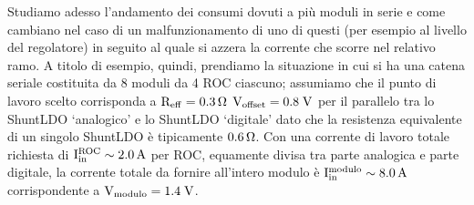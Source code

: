 Studiamo adesso l'andamento dei consumi dovuti a più moduli in serie e come cambiano nel caso di un malfunzionamento di uno di questi (per esempio al livello del regolatore) in seguito al quale si azzera la corrente che scorre nel relativo ramo.
A titolo di esempio, quindi, prendiamo la situazione in cui si ha una catena seriale costituita da 8 moduli da 4 ROC ciascuno; 
assumiamo che il punto di lavoro scelto corrisponda a $\mathrm{R_{eff}=0.3{\rm \, \Omega}}$ $\mathrm{V_{offset}=0.8}\rm \; V$ per il parallelo tra lo ShuntLDO `analogico' e lo ShuntLDO `digitale' dato che la resistenza equivalente di un singolo ShuntLDO \`e tipicamente $0.6{\rm \, \Omega}$.
Con una corrente di lavoro totale richiesta di $\mathrm{I^{ROC}_{in}\sim2.0}\rm \, A$ per ROC, equamente divisa tra parte analogica e parte digitale, la corrente totale da fornire all'intero modulo \`e $\mathrm{I_{in}^{modulo}\sim8.0}\rm \, A$ corrispondente a $\mathrm{V_{modulo}=1.4} \rm \; V$.

